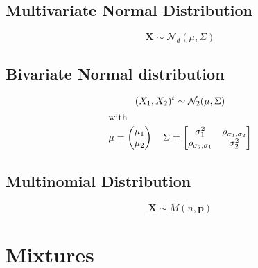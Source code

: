 \subsection{Multivariate Normal Distribution} %
\label{sub:multivariate_normal_distribution}

\begin{equation*}
    \textbf{X} \sim \mathcal{N}_d(\mu,\Sigma)
\end{equation*}
    


\subsection{Bivariate Normal distribution} %
\label{sub:bivariate_normal_distribution}
\begin{gather*}
    (X_1,X_2)^t \sim \mathcal{N}_2(\mu,\Sigma)\\
    \intertext{with}
    \mu=\begin{pmatrix}
    \mu_1\\
    \mu_2
    \end{pmatrix}
    \quad 
    \Sigma=\begin{bmatrix}
    \sigma_1^2 & \rho_{\sigma_1,\sigma_2}\\
    \rho_{\sigma_2,\sigma_1} & \sigma^2_2
    \end{bmatrix}
\end{gather*}



\subsection{Multinomial Distribution} %
\label{sub:multinomial_distribution}

\begin{equation*}
    \textbf{X} \sim M(n,\textbf{p})
\end{equation*}


\section{Mixtures} %
\label{sec:mixtures}

